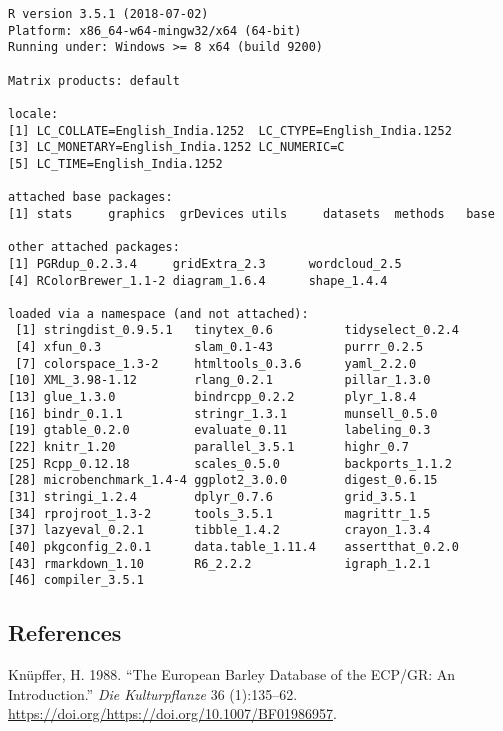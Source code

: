 \documentclass[]{article}
\begin{document}
\begin{verbatim}
R version 3.5.1 (2018-07-02)
Platform: x86_64-w64-mingw32/x64 (64-bit)
Running under: Windows >= 8 x64 (build 9200)

Matrix products: default

locale:
[1] LC_COLLATE=English_India.1252  LC_CTYPE=English_India.1252   
[3] LC_MONETARY=English_India.1252 LC_NUMERIC=C                  
[5] LC_TIME=English_India.1252    

attached base packages:
[1] stats     graphics  grDevices utils     datasets  methods   base     

other attached packages:
[1] PGRdup_0.2.3.4     gridExtra_2.3      wordcloud_2.5     
[4] RColorBrewer_1.1-2 diagram_1.6.4      shape_1.4.4       

loaded via a namespace (and not attached):
 [1] stringdist_0.9.5.1   tinytex_0.6          tidyselect_0.2.4    
 [4] xfun_0.3             slam_0.1-43          purrr_0.2.5         
 [7] colorspace_1.3-2     htmltools_0.3.6      yaml_2.2.0          
[10] XML_3.98-1.12        rlang_0.2.1          pillar_1.3.0        
[13] glue_1.3.0           bindrcpp_0.2.2       plyr_1.8.4          
[16] bindr_0.1.1          stringr_1.3.1        munsell_0.5.0       
[19] gtable_0.2.0         evaluate_0.11        labeling_0.3        
[22] knitr_1.20           parallel_3.5.1       highr_0.7           
[25] Rcpp_0.12.18         scales_0.5.0         backports_1.1.2     
[28] microbenchmark_1.4-4 ggplot2_3.0.0        digest_0.6.15       
[31] stringi_1.2.4        dplyr_0.7.6          grid_3.5.1          
[34] rprojroot_1.3-2      tools_3.5.1          magrittr_1.5        
[37] lazyeval_0.2.1       tibble_1.4.2         crayon_1.3.4        
[40] pkgconfig_2.0.1      data.table_1.11.4    assertthat_0.2.0    
[43] rmarkdown_1.10       R6_2.2.2             igraph_1.2.1        
[46] compiler_3.5.1      
\end{verbatim}

\hypertarget{references}{%
\subsection*{References}\label{references}}

\hypertarget{refs}{}
\leavevmode\hypertarget{ref-knupffer1988european}{}%
Knüpffer, H. 1988. ``The European Barley Database of the ECP/GR: An
Introduction.'' \emph{Die Kulturpflanze} 36 (1):135--62.
\url{https://doi.org/https://doi.org/10.1007/BF01986957}.
\end{document}
